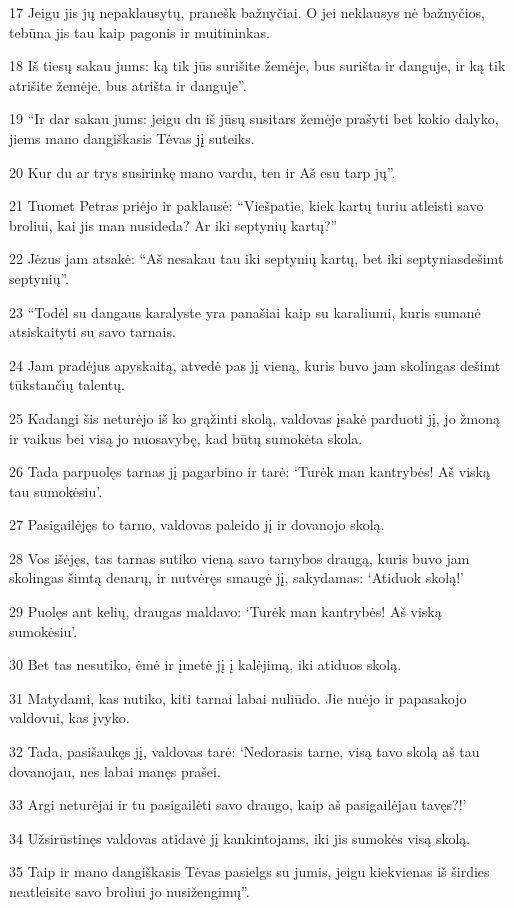 \par 17 Jeigu jis jų nepaklausytų, pranešk bažnyčiai. O jei neklausys nė bažnyčios, tebūna jis tau kaip pagonis ir muitininkas. 
\par 18 Iš tiesų sakau jums: ką tik jūs surišite žemėje, bus surišta ir danguje, ir ką tik atrišite žemėje, bus atrišta ir danguje”. 
\par 19 “Ir dar sakau jums: jeigu du iš jūsų susitars žemėje prašyti bet kokio dalyko, jiems mano dangiškasis Tėvas jį suteiks. 
\par 20 Kur du ar trys susirinkę mano vardu, ten ir Aš esu tarp jų”. 
\par 21 Tuomet Petras priėjo ir paklausė: “Viešpatie, kiek kartų turiu atleisti savo broliui, kai jis man nusideda? Ar iki septynių kartų?” 
\par 22 Jėzus jam atsakė: “Aš nesakau tau iki septynių kartų, bet iki septyniasdešimt septynių”. 
\par 23 “Todėl su dangaus karalyste yra panašiai kaip su karaliumi, kuris sumanė atsiskaityti su savo tarnais. 
\par 24 Jam pradėjus apyskaitą, atvedė pas jį vieną, kuris buvo jam skolingas dešimt tūkstančių talentų. 
\par 25 Kadangi šis neturėjo iš ko grąžinti skolą, valdovas įsakė parduoti jį, jo žmoną ir vaikus bei visą jo nuosavybę, kad būtų sumokėta skola. 
\par 26 Tada parpuolęs tarnas jį pagarbino ir tarė: ‘Turėk man kantrybės! Aš viską tau sumokėsiu’. 
\par 27 Pasigailėjęs to tarno, valdovas paleido jį ir dovanojo skolą. 
\par 28 Vos išėjęs, tas tarnas sutiko vieną savo tarnybos draugą, kuris buvo jam skolingas šimtą denarų, ir nutvėręs smaugė jį, sakydamas: ‘Atiduok skolą!’ 
\par 29 Puolęs ant kelių, draugas maldavo: ‘Turėk man kantrybės! Aš viską sumokėsiu’. 
\par 30 Bet tas nesutiko, ėmė ir įmetė jį į kalėjimą, iki atiduos skolą. 
\par 31 Matydami, kas nutiko, kiti tarnai labai nuliūdo. Jie nuėjo ir papasakojo valdovui, kas įvyko. 
\par 32 Tada, pasišaukęs jį, valdovas tarė: ‘Nedorasis tarne, visą tavo skolą aš tau dovanojau, nes labai manęs prašei. 
\par 33 Argi neturėjai ir tu pasigailėti savo draugo, kaip aš pasigailėjau tavęs?!’ 
\par 34 Užsirūstinęs valdovas atidavė jį kankintojams, iki jis sumokės visą skolą. 
\par 35 Taip ir mano dangiškasis Tėvas pasielgs su jumis, jeigu kiekvienas iš širdies neatleisite savo broliui jo nusižengimų”.



